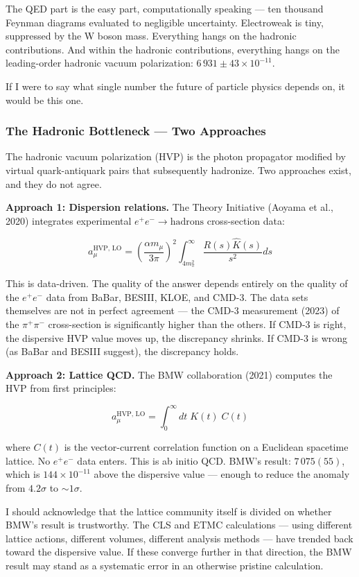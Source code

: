 \documentclass[12pt,a4paper]{article}
\begin{document}
The QED part is the easy part, computationally speaking --- ten thousand Feynman diagrams evaluated to negligible uncertainty. Electroweak is tiny, suppressed by the W boson mass. Everything hangs on the hadronic contributions. And within the hadronic contributions, everything hangs on the leading-order hadronic vacuum polarization: $6\,931 \pm 43 \times 10^{-11}$.

If I were to say what single number the future of particle physics depends on, it would be this one.

\subsubsection{The Hadronic Bottleneck --- Two Approaches}

The hadronic vacuum polarization (HVP) is the photon propagator modified by virtual quark-antiquark pairs that subsequently hadronize. Two approaches exist, and they do not agree.

\textbf{Approach 1: Dispersion relations.} The Theory Initiative (Aoyama et al., 2020) integrates experimental $e^+e^- \to \text{hadrons}$ cross-section data:

\[a_{\mu}^\text{HVP, LO} = \left(\frac{\alpha m_{\mu}}{3\pi}\right)^2 \int_{4m_{\pi}^2}^\infty \frac{R(s) \hat{K}(s)}{s^2} ds\]

This is data-driven. The quality of the answer depends entirely on the quality of the $e^+e^-$ data from BaBar, BESIII, KLOE, and CMD-3. The data sets themselves are not in perfect agreement --- the CMD-3 measurement (2023) of the $\pi^+\pi^-$ cross-section is significantly higher than the others. If CMD-3 is right, the dispersive HVP value moves up, the discrepancy shrinks. If CMD-3 is wrong (as BaBar and BESIII suggest), the discrepancy holds.

\textbf{Approach 2: Lattice QCD.} The BMW collaboration (2021) computes the HVP from first principles:

\[a_{\mu}^\text{HVP, LO} = \int_0^\infty dt \; K(t) \; C(t)\]

where $C(t)$ is the vector-current correlation function on a Euclidean spacetime lattice. No $e^+e^-$ data enters. This is ab initio QCD. BMW's result: $7\,075(55)$, which is $144 \times 10^{-11}$ above the dispersive value --- enough to reduce the anomaly from $4.2\sigma$ to $\sim 1\sigma$.

I should acknowledge that the lattice community itself is divided on whether BMW's result is trustworthy. The CLS and ETMC calculations --- using different lattice actions, different volumes, different analysis methods --- have trended back toward the dispersive value. If these converge further in that direction, the BMW result may stand as a systematic error in an otherwise pristine calculation.
\end{document}
